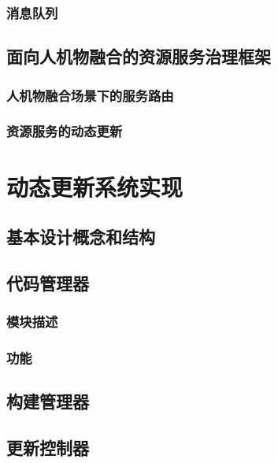 \documentclass[12pt,a4paper]{article}
\begin{document}
\subsubsection{消息队列}

\subsection{面向人机物融合的资源服务治理框架}
\subsubsection{人机物融合场景下的服务路由}
\subsubsection{资源服务的动态更新}
\newpage
\section{动态更新系统实现}\label{}

\subsection{基本设计概念和结构}

\subsection{代码管理器}
\subsubsection{模块描述}
\subsubsection{功能}

\subsection{构建管理器}

\subsection{更新控制器}

\end{document}
